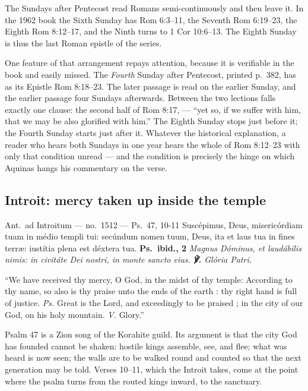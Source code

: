 The Sundays after Pentecost read Romans semi-continuously and then leave it.
In the 1962 book the Sixth Sunday has Rom 6:3--11, the Seventh Rom 6:19--23,
the Eighth Rom 8:12--17, and the Ninth turns to 1 Cor 10:6--13. The Eighth
Sunday is thus the last Roman epistle of the series.

One feature of that arrangement repays attention, because it is verifiable in
the book and easily missed. The \emph{Fourth} Sunday after Pentecost, printed
p.\ 382, has as its Epistle Rom 8:18--23. The later passage is read on the
earlier Sunday, and the earlier passage four Sundays afterwards. Between the
two lections falls exactly one clause: the second half of Rom 8:17,
 --- ``yet so, if we suffer
with him, that we may be also glorified with him.'' The Eighth Sunday stops
just before it; the Fourth Sunday starts just after it. Whatever the
historical explanation, a reader who hears both Sundays in one year hears the
whole of Rom 8:12--23 with only that condition unread --- and the condition is
precisely the hinge on which Aquinas hangs his commentary on the verse.

\subsection{Introit: mercy taken up inside the temple }

\begin{appointed}{Ant.\ ad Introitum --- no.\ 1512 --- Ps.\ 47, 10-11}
Suscépimus, Deus, misericórdiam tuam in médio templi tui: secúndum nomen tuum,
Deus, ita et laus tua in fines terr\ae: iustítia plena est déxtera tua.
\upshape\textbf{Ps.\ ibid., 2} \itshape Magnus Dóminus, et laudábilis nimis: in
civitáte Dei nostri, in monte sancto eius. \upshape\textbf{℣.} \itshape Glória
Patri.
\end{appointed}

\begin{englishwitness}
``We have received thy mercy, O God, in the midst of thy temple: According to
thy name, so also is thy praise unto the ends of the earth : thy right hand is
full of justice. \emph{Ps.} Great is the Lord, and exceedingly to be praised ;
in the city of our God, on his holy mountain. \emph{V.} Glory.''
\end{englishwitness}

Psalm 47 is a Zion song of the Korahite guild. Its argument is that the city
God has founded cannot be shaken: hostile kings assemble, see, and flee; what
was heard is now seen; the walls are to be walked round and counted so that the
next generation may be told. Verses 10--11, which the Introit takes, come at
the point where the psalm turns from the routed kings inward, to the sanctuary.

